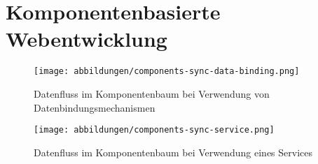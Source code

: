 \section{Komponentenbasierte Webentwicklung}
\label{sec-komponentenbasierte-webentwicklung}




\begin{figure}[htbp]
\centering
\texttt{[image: abbildungen/components-sync-data-binding.png]}
\caption{Datenfluss im Komponentenbaum bei Verwendung von Datenbindungsmechanismen}
\label{components-sync-data-binding}
\end{figure}




\begin{figure}[htbp]
\centering
\texttt{[image: abbildungen/components-sync-service.png]}
\caption{Datenfluss im Komponentenbaum bei Verwendung eines Services}
\label{components-sync-service}
\end{figure}

